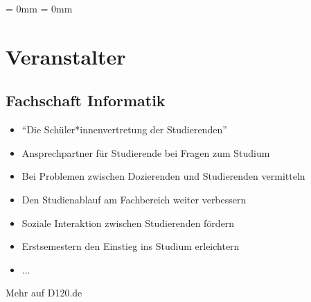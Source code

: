 

\usepackage{listings}
\usepackage{tikz}
\usepackage{tabularx,booktabs,multirow,multicol,colortbl}
\aboverulesep = 0mm \belowrulesep = 0mm

\def\streamlink{https://youtu.be/dTWa0Tk3C9U}
\def\moodlecourselink{https://moodle.informatik.tu-darmstadt.de/course/view.php?id=1502}



\subtitle{Organisatorisches}
\maketitle

\section{Veranstalter}
\subsection*{Fachschaft Informatik}
\begin{frame}
    \slidehead
    \begin{itemize}
        \item "`Die Schüler*innenvertretung der Studierenden"'
        \item Ansprechpartner für Studierende bei Fragen zum Studium
        \item Bei Problemen zwischen Dozierenden und Studierenden vermitteln
        \item Den Studienablauf am Fachbereich weiter verbessern
        \item Soziale Interaktion zwischen Studierenden fördern
        \item Erstsemestern den Einstieg ins Studium erleichtern
        \item ...
    \end{itemize}
    \centering
    \vspace{3mm}
    \huge Mehr auf D120.de
\end{frame}

